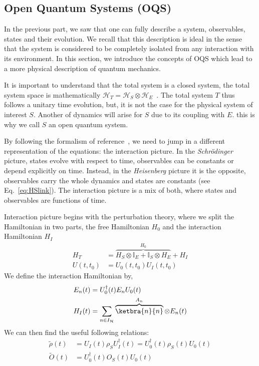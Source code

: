 \subsection[Open quantum systems]{Open Quantum Systems (OQS)}\label{OQS}
\setlength{\parskip}{2mm}
In the previous part, we saw that one can fully describe a system, observables, states and their evolution. We recall that this description is ideal in the sense that the system is considered to be completely isolated from any interaction with its environment. %
In this section, we introduce the concepts of OQS which lead to a more physical description of quantum mechanics.\par
It is important to understand that the total system is a closed system, the total system space is mathematically $\mathcal{H} %
_T=\mathcal{H}_S\otimes\mathcal{H}_E$~. The total system $T$ thus follows a unitary time evolution, but, it is not the case for the physical system of interest $S$. Another of dynamics will arise for $S$ due to its coupling with $E$.
this is why we call $S$ an open quantum system.\par %

By following the formalism of reference~\cite{Breuer}, we need to jump in a different representation of the equations: the interaction picture. %
In the \textit{Schrödinger} picture, states evolve with respect to time, observables can be constants or depend explicitly on time. Instead, in the \textit{Heisenberg} picture it is the opposite, observables carry the whole dynamics and states are constants (see Eq.~\ref{eq:HSlink}). The interaction picture is a mix of both, where states and observables are functions of time.\par

Interaction picture begins with the perturbation theory, where we split the Hamiltonian in two parts, the free Hamiltonian $H_0$ and the interaction Hamiltonian $H_I$ %
\begin{align}
    H_T &= \overbrace{H_S\otimes\mathbb{I}_E+\mathbb{I}_S\otimes H_E}^{H_0}+H_I\label{eq:Htotal}\\
    U(t,t_0) &= U_0(t,t_0)U_I(t,t_0)\label{eq:Utotal}
\end{align}
We define the interaction Hamiltonian by,
\begin{align}
    E_n(t) &= U^\dagger_0(t)E_n U_0(t)\\
    H_I(t) &= \sum_{n\in I_\mathcal{H}}\overbrace{\ketbra{n}{n}}^{A_n}\otimes E_n(t)
\end{align}
We can then find the useful following relations:
\begin{align}
    \tilde{\rho}(t)&=U_I(t)\rho_{S}U_I^\dagger(t)= U^\dagger_0(t)\rho_S(t)U_0(t)\label{eq:rhoIP}\\
    \tilde{O}(t) &= U_0^\dagger(t)O_S(t)U_0(t)\label{eq:OIP}
\end{align}

